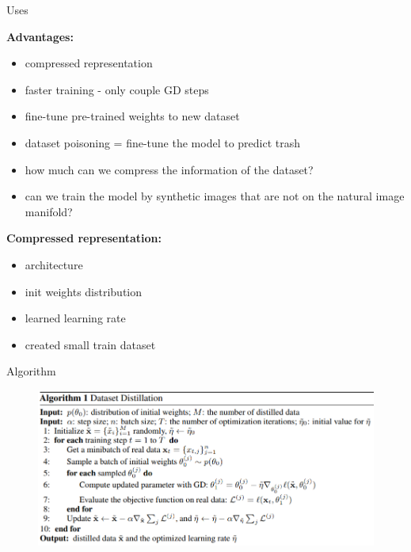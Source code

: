 \documentclass{beamer}
\begin{document}
\begin{frame}{Uses}

\textbf{Advantages:}
\begin{itemize}
\item compressed representation
\item faster training - only couple GD steps\
\item fine-tune pre-trained weights to new dataset
\item dataset poisoning = fine-tune the model to predict trash
\item how much can we compress the information of the dataset?
\item can we train the model by synthetic images that
are not on the natural image manifold?
\end{itemize}

\vfill

\textbf{Compressed representation:}
\begin{itemize}
\item architecture
\item init weights distribution
\item learned learning rate
\item created small train dataset
\end{itemize}

\end{frame}
\begin{frame}{Algorithm}
\begin{figure}[h]
\includegraphics[width=\textwidth]{img/alg1}
\end{figure}
\end{frame}
\end{document}
